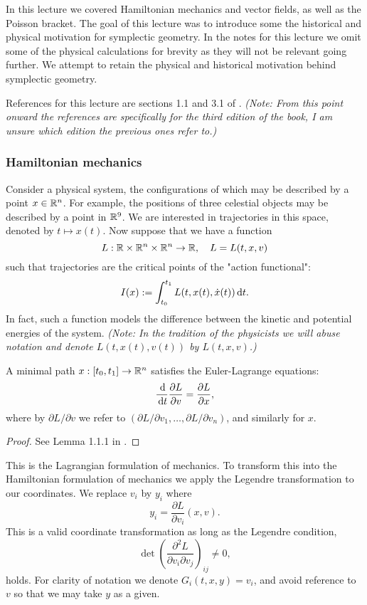 In this lecture we covered Hamiltonian mechanics and vector fields, as well as the Poisson bracket.
The goal of this lecture was to introduce some the historical and physical motivation for symplectic geometry.
In the notes for this lecture we omit some of the physical calculations for brevity as they will not be relevant going further.
We attempt to retain the physical and historical motivation behind symplectic geometry.

References for this lecture are sections 1.1 and 3.1 of \cite{intro}.
\emph{(Note: From this point onward the references are specifically for the third edition of the book, I am unsure which edition the previous ones refer to.)}

\subsubsection*{Hamiltonian mechanics}
Consider a physical system, the configurations of which may be described by a point $x\in\mathbb{R}^n$.
For example, the positions of three celestial objects may be described by a point in $\mathbb{R}^9$.
We are interested in trajectories in this space, denoted by $t\mapsto x(t)$.
Now suppose that we have a function
\[L:\mathbb{R}\times\mathbb{R}^n\times\mathbb{R}^n\to\mathbb{R},\quad L=L(t,x,v)\]
such that trajectories are the critical points of the "action functional":
\[I(x):=\int_{t_0}^{t_1}L(t,x(t),\dot x(t))\,\mathrm d t.\]
In fact, such a function models the difference between the kinetic and potential energies of the system.
\emph{(Note: In the tradition of the physicists we will abuse notation and denote $L(t,x(t),v(t))$ by $L(t,x,v)$.)}

\begin{lem}[]
    A minimal path $x:[t_0,t_1]\to\mathbb{R}^n$ satisfies the Euler-Lagrange equations:
    \[\frac{\,\mathrm d}{\,\mathrm d t}\frac{\partial L}{\partial v}=\frac{\partial L}{\partial x},\]
    where by $\partial L/\partial v$ we refer to $(\partial L/\partial v_1,\ldots,\partial L/\partial v_n)$, and similarly for $x$.
\end{lem}

\begin{proof}
    See Lemma 1.1.1 in \cite{intro}.
\end{proof}

This is the Lagrangian formulation of mechanics.
To transform this into the Hamiltonian formulation of mechanics we apply the Legendre transformation to our coordinates.
We replace $v_i$ by $y_i$ where
\[y_i=\frac{\partial L}{\partial v_i}(x,v).\]
This is a valid coordinate transformation as long as the Legendre condition,
\[\det\left(\frac{\partial^2L}{\partial v_i\partial v_j}\right)_{ij}\neq0,\]
                      holds.
For clarity of notation we denote $G_i(t,x,y)=v_i$, and avoid reference to $v$ so that we may take $y$ as a given.

